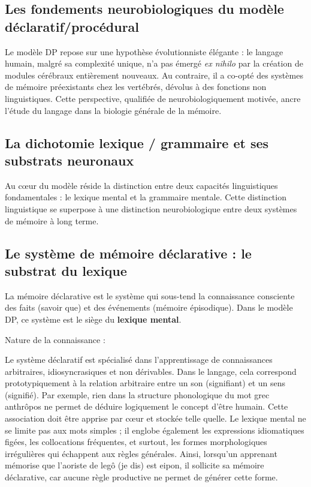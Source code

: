 \subsection{Les fondements neurobiologiques du modèle déclaratif/procédural}

Le modèle DP repose sur une hypothèse évolutionniste élégante : le langage humain, malgré sa
complexité unique, n'a pas émergé \textit{ex nihilo} par la création de modules cérébraux
entièrement nouveaux. Au contraire, il a \og co-opté\fg{} des systèmes de mémoire préexistants chez
les vertébrés, dévolus à des fonctions non linguistiques. Cette perspective, qualifiée de \og
neurobiologiquement motivée\fg{}, ancre l'étude du langage dans la biologie générale de la mémoire.



\subsection{La dichotomie lexique / grammaire et ses substrats neuronaux}

Au cœur du modèle réside la distinction entre deux capacités linguistiques fondamentales : le
lexique mental et la grammaire mentale. Cette distinction linguistique se superpose à une
distinction neurobiologique entre deux systèmes de mémoire à long terme.



\subsection{Le système de mémoire déclarative : le substrat du lexique}

La mémoire déclarative est le système qui sous-tend la connaissance consciente des faits (\og savoir
que\fg{}) et des événements (mémoire épisodique). Dans le modèle DP, ce système est le siège du
\textbf{lexique mental}.

Nature de la connaissance :

Le système déclaratif est spécialisé dans l'apprentissage de connaissances arbitraires,
idiosyncrasiques et non dérivables. Dans le langage, cela correspond prototypiquement à la relation
arbitraire entre un son (signifiant) et un sens (signifié). Par exemple, rien dans la structure
phonologique du mot grec anthrôpos ne permet de déduire logiquement le concept d'\og être
humain\fg{}. Cette association doit être apprise par cœur et stockée telle quelle. Le lexique mental
ne se limite pas aux mots simples ; il englobe également les expressions idiomatiques figées, les
collocations fréquentes, et surtout, les formes morphologiques irrégulières qui échappent aux règles
générales. Ainsi, lorsqu'un apprenant mémorise que l'aoriste de legô (je dis) est eipon, il
sollicite sa mémoire déclarative, car aucune règle productive ne permet de générer cette forme.

